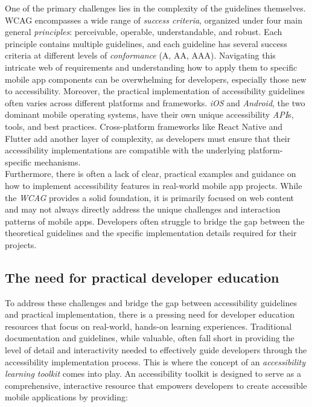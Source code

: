 One of the primary challenges lies in the complexity of the guidelines themselves. WCAG encompasses a wide range of \textit{success criteria}, organized under four main general \textit{principles}: perceivable, operable, understandable, and robust. Each principle contains multiple guidelines, and each guideline has several success criteria at different levels of \textit{conformance} (A, AA, AAA). Navigating this intricate web of requirements and understanding how to apply them to specific mobile app components can be overwhelming for developers, especially those new to accessibility. 
Moreover, the practical implementation of accessibility guidelines often varies across different platforms and frameworks. \textit{iOS} and \textit{Android}, the two dominant mobile operating systems, have their own unique accessibility \textit{API}s, tools, and best practices. Cross-platform frameworks like React Native and Flutter add another layer of complexity, as developers must ensure that their accessibility implementations are compatible with the underlying platform-specific mechanisms. \\ 

Furthermore, there is often a lack of clear, practical examples and guidance on how to implement accessibility features in real-world mobile app projects. While the \textit{WCAG} provides a solid foundation, it is primarily focused on web content and may not always directly address the unique challenges and interaction patterns of mobile apps. Developers often struggle to bridge the gap between the theoretical guidelines and the specific implementation details required for their projects.

\subsection{The need for practical developer education}

To address these challenges and bridge the gap between accessibility guidelines and practical implementation, there is a pressing need for developer education resources that focus on real-world, hands-on learning experiences. Traditional documentation and guidelines, while valuable, often fall short in providing the level of detail and interactivity needed to effectively guide developers through the accessibility implementation process.
This is where the concept of an \textit{accessibility learning toolkit} comes into play. An accessibility toolkit is designed to serve as a comprehensive, interactive resource that empowers developers to create accessible mobile applications by providing:

